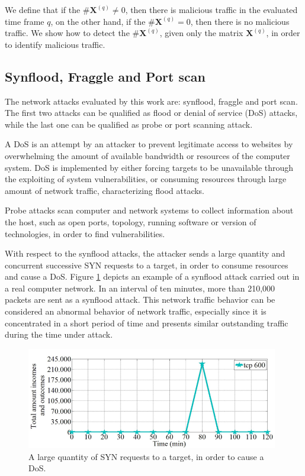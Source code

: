 We define that if the $\#\pmb{X}^{(q)} \neq 0$, then there is malicious traffic in the evaluated time frame $q$, on the other hand, if the $\#\pmb{X}^{(q)} = 0$, then there is no malicious traffic. We show how to detect the $\#\pmb{X}^{(q)}$, given only the matrix $\pmb{X}^{(q)}$, in order to identify malicious traffic.

\subsection{Synflood, Fraggle and Port scan}
\label{sec:2_SynfloodFraggleandPortscan}

The network attacks evaluated by this work are: synflood, fraggle and port scan. The first two attacks can be qualified as flood or denial of service (DoS) attacks, while the last one can be qualified as probe or port scanning attack. 

A DoS is an attempt by an attacker to prevent legitimate access to websites by overwhelming the amount of available bandwidth or resources of the computer system. DoS is implemented by either forcing targets to be unavailable through the exploiting of system vulnerabilities, or consuming resources through large amount of network traffic, characterizing flood attacks.

Probe attacks scan computer and network systems to collect information about the host, such as open ports, topology, running software or version of technologies, in order to find vulnerabilities.

With respect to the synflood attacks, the attacker sends a large quantity and concurrent successive SYN requests to a target, in order to consume resources and cause a DoS. Figure \ref{fig:2.05} depicts an example of a synflood attack carried out in a real computer network. In an interval of ten minutes, more than 210,000 packets are sent as a synflood attack. This network traffic behavior can be considered an abnormal behavior of network traffic, especially since it is concentrated in a short period of time and presents similar outstanding traffic during the time under attack.

\begin{figure}[h!]
     \centering 
     \includegraphics[width=11cm]{figs/ch2/fig05.png}
     \caption{A large quantity of SYN requests to a target, in order to cause a DoS.}
     \label{fig:2.05}
\end{figure}

